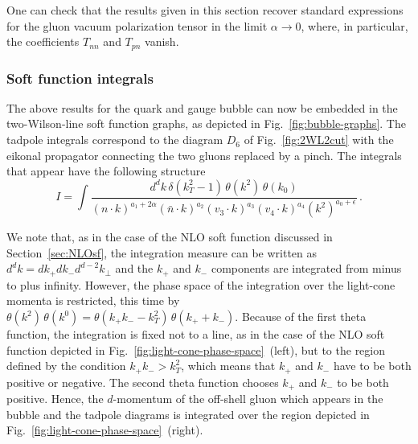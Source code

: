 \documentclass[a4paper,11pt]{article}
\newcommand{\nbar}{\ensuremath{\bar{n}}}
\numberwithin{equation}{section}
\begin{document}
One can check that the results given in this section recover standard
expressions for the gluon vacuum polarization tensor in the limit $\alpha \to
0$, where, in particular, the coefficients $T_{nn}$ and $T_{pn}$ vanish.

\subsubsection{Soft function integrals}

The above results for the quark and gauge bubble can now be embedded in the
two-Wilson-line soft function graphs, as depicted in
Fig.~\ref{fig:bubble-graphs}. 
%
The tadpole integrals correspond to the diagram $D_6$ of
Fig.~\ref{fig:2WL2cut} with the eikonal propagator connecting the two
gluons replaced by a pinch.
%
The integrals that appear have the following structure 
%
\begin{equation}
  I = \int\frac{d^d k\, \delta(k_T^2-1)\, \theta(k^2)\, \theta(k_0)}
      {(n\cdot k)^{a_1+2\alpha} (\nbar\cdot k)^{a_2} (v_3 \cdot k)^{a_3} (v_4
      \cdot k)^{a_4} (k^2)^{a_0+\epsilon}}\,.
  \label{eq:sfnf-general-structure}
\end{equation}

We note that, as in the case of the NLO soft function discussed in
Section~\ref{sec:NLOsf}, the integration measure can be written as $d^d k = d
k_+ d k_- d^{d-2} k_\perp$ and the $k_+$ and $k_-$ components are integrated
from minus to plus infinity.
%
However, the phase space of the integration over the light-cone momenta is
restricted, this time by $\theta(k^2)\, \theta(k^0) = \theta(k_+ k_- -
k_T^2)\, \theta(k_+ + k_-)$.  Because of the first theta function, the
integration is fixed not to a line, as in the case of the NLO soft function
depicted in Fig.~\ref{fig:light-cone-phase-space}~(left), but to the region
defined by the condition $k_+ k_- > k_T^2$, which means that $k_+$ and $k_-$
have to be both positive or negative.  The second theta function chooses
$k_+$ and $k_-$ to be both positive. 
%
Hence, the $d$-momentum of the off-shell gluon which appears in the bubble and
the tadpole diagrams is integrated over  the region depicted in
Fig.~\ref{fig:light-cone-phase-space}~(right).
\end{document}
